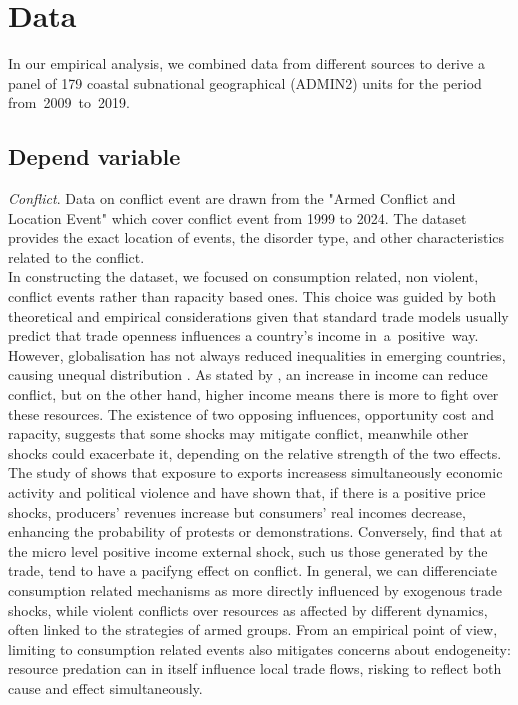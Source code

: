 \chapter{Data}
In our empirical analysis, we combined data from different sources to derive a panel of 179 coastal subnational geographical (ADMIN2) units for the period from 2009 to 2019. \\
\section{Depend variable}
\textit{Conflict}. Data on conflict event are drawn from the "Armed Conflict and Location Event" \textcite{acled2025} which cover conflict event from 1999 to 2024. The dataset provides the exact location of events, the disorder type, and other characteristics related to the conflict. \parencite{raleigh2010introducing}\\
In constructing the dataset, we focused on consumption related, non violent, conflict events rather than rapacity based ones. This choice was guided by both theoretical and empirical considerations given that standard trade models usually predict that trade openness influences a country’s income in a positive way. However, globalisation has not always reduced inequalities in emerging countries, causing unequal distribution \parencite{dixcarneiro2023globalization}.
As stated by \textcite{dube2013commodity}, an increase in income can reduce conflict, but on the other hand, higher income means there is more to fight over these resources. The existence of two opposing influences, opportunity cost and rapacity, suggests that some shocks may mitigate conflict, meanwhile other shocks could exacerbate it, depending on the relative strength of the two effects.
The study of \textcite{amodio2024trade} shows that exposure to exports increasess simultaneously economic activity and political violence and \textcite{mcguirk2020economic} have shown that, if there is a positive price shocks, producers' revenues increase but consumers' real incomes decrease, enhancing the probability of protests or demonstrations. Conversely, \textcite{berman2015external} find that at the micro level positive income external shock, such us those generated by the trade, tend to have a pacifyng effect on conflict.   
In general, we can differenciate consumption related mechanisms as more directly influenced by exogenous trade shocks, while violent conflicts over resources as affected by different dynamics, often linked to the strategies of armed groups. From an empirical point of view, limiting to consumption related events also mitigates concerns about endogeneity: resource predation can in itself influence local trade flows, risking to reflect both cause and effect simultaneously. \\

